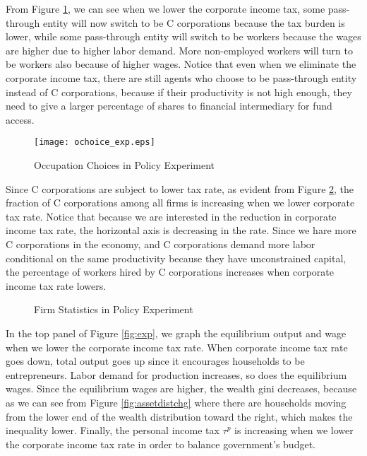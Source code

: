 \documentclass[12pt]{article}
\begin{document}
From Figure \ref{fig:ochoice_exp}, we can see when we lower the corporate income tax, some pass-through entity will now switch to be C corporations because the tax burden is lower, while some pass-through entity will switch to be workers because the wages are higher due to higher labor demand. More non-employed workers will turn to be workers also because of higher wages. Notice that even when we eliminate the corporate income tax, there are still agents who choose to be pass-through entity instead of C corporations, because if their productivity is not high enough, they need to give a larger percentage of shares to financial intermediary for fund access. 

\begin{figure}[!ht]
\centering
\caption{\sc Occupation Choices in Policy Experiment}
\texttt{[image: ochoice\_exp.eps]}\label{fig:ochoice_exp}
\end{figure}

Since C corporations are subject to lower tax rate, as evident from Figure \ref{fig:firmstat}, the fraction of C corporations among all firms is increasing when we lower corporate tax rate. Notice that because we are interested in the reduction in corporate income tax rate, the horizontal axis is decreasing in the rate. Since we hare more C corporations in the economy, and C corporations demand more labor conditional on the same productivity because they have unconstrained capital, the percentage of workers hired by C corporations increases when corporate income tax rate lowers. 

\begin{figure}[!ht]
\centering
\caption{\sc Firm Statistics in Policy Experiment}\label{fig:firmstat}
\subfiguretopcaptrue
{}
\quad
{}
\end{figure}

In the top panel of Figure \ref{fig:exp}, we graph the equilibrium output and wage when we lower the corporate income tax rate. When corporate income tax rate goes down, total output goes up since it encourages households to be entrepreneurs. Labor demand for production increases, so does the equilibrium wages. Since the equilibrium wages are higher, the wealth gini decreases, because as we can see from Figure \ref{fig:assetdistchg} where there are households moving from the lower end of the wealth distribution toward the right, which makes the inequality lower. Finally, the personal income tax $\tau^p$ is increasing when we lower the corporate income tax rate in order to balance government's budget. 
\end{document}
